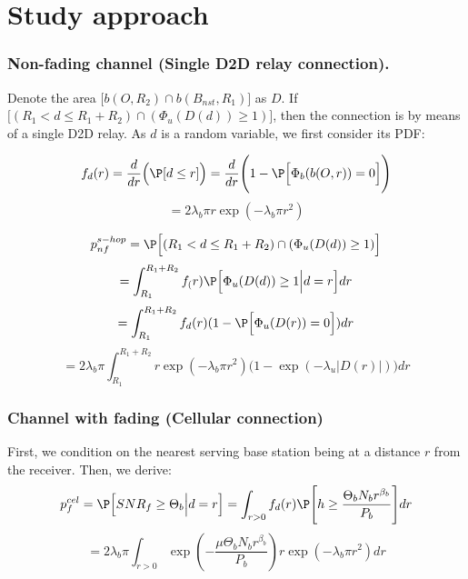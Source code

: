 \section {Study approach}

\begin {frame}
  \frametitle {Non-fading channel (Single D2D relay connection).}
  \par Denote the area $\Big[b(O,R_2)\cap b(B_{nst},R_1)\Big]$ as $D$. If $\Big[(R_1<d\le R_1+R_2)\cap(\Phi_u(D(d))\ge 1)\Big]$, then the connection is by means of a single D2D relay. As $d$ is a random variable, we first consider its PDF:
  \begin {block} {}
    \[f_d(r)=\frac {d} {dr}\Big(\P[d\le r]\Big)=\frac {d} {dr}\Bigg(1-\P\Big[\Phi_b(b(O,r))=0\Big]\Bigg)\]
    \[=2\lambda_b\pi r\exp(-\lambda_b\pi r^2)\]
  \end {block}
\end {frame}

\begin {frame}
  \begin {block} {}
    \[p_{nf}^{s-hop}=\P\Big[(R_1<d\le R_1+R_2)\cap(\Phi_u(D(d))\ge 1)\Big]\]
    \[=\int_{R_1}^{R_1+R_2}f_(r)\P\Big[\Phi_u(D(d))\ge 1 \Big| d=r\Big]dr\]
    \[=\int_{R_1}^{R_1+R_2}f_d(r)(1-\P\Big[\Phi_u(D(r))=0\Big])dr\]
    \[=2\lambda_b\pi\int_{R_1}^{R_1+R_2}r\exp(-\lambda_b\pi r^2)\Big(1-\exp(-\lambda_u|D(r)|)\Big)dr\]
  \end {block}
\end {frame}

\begin {frame}
  \frametitle {Channel with fading (Cellular connection)}
  \par First, we condition on the nearest serving base station being at a distance $r$ from the receiver. Then, we derive:
  \[p_{f}^{cel}=\P\Big[SNR_f\ge\Theta_b\Big|d=r\Big]=\int_{r>0}f_d(r)\P\Bigg[h\ge\frac {\Theta_b N_b r^{\beta_b}} {P_b}\Bigg]dr\]
  \[=2\lambda_b\pi\int_{r>0}\exp(-\frac {\mu\Theta_b N_b r^{\beta_b}} {P_b})r\exp(-\lambda_b\pi r^2)dr\]
\end {frame}

